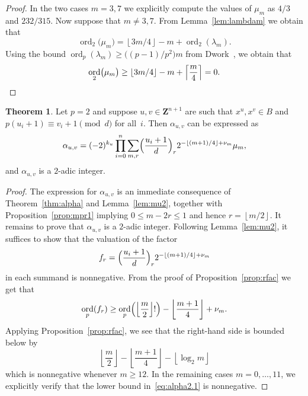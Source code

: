 \documentclass[a4paper,11pt]{article}
\numberwithin{equation}{section}
\providecommand{\floor}[1]{\left\lfloor#1\right\rfloor}   %
\providecommand{\ceil}[1]{\left\lceil#1\right\rceil}   %
\newcommand{\ZZ}{\mathbf{Z}} %
\DeclareMathOperator{\ord}{ord}          %
\theoremstyle{definition}
\newtheorem{thm}{Theorem}[section]
\begin{document}
\begin{proof}
In the two cases $m = 3, 7$ we explicitly compute the values of 
$\mu_m$ as $4/3$ and $232/315$.  Now suppose that $m \neq 3, 7$. 
From Lemma~\ref{lem:lambdam} we obtain that 
\begin{equation*}
\ord_2 \bigl(\mu_m\bigr) 
    = \floor{3m/4} - m + \ord_2(\lambda_m).
\end{equation*}
Using the bound $\ord_p(\lambda_m) \geq \bigl((p-1)/p^2\bigr) m$ from 
Dwork~\citep[pp.~55--57]{Dwork1962}, we obtain that 
\begin{equation*}
\ord_2 \bigl(\mu_m\bigr) 
    \geq \floor{3m/4} - m + \ceil{\frac{m}{4}} = 0. \qedhere
\end{equation*}
\end{proof}

\begin{thm} \label{thm:alpha2}
Let $p = 2$ and suppose $u, v \in \ZZ^{n+1}$ are such that 
$x^u, x^v \in B$ and $p (u_i + 1) \equiv v_i + 1 \pmod{d}$ 
for all~$i$.  Then $\alpha_{u,v}$ can be expressed as 
\begin{equation} \label{eq:alpha2.0}
\alpha_{u,v} = (-2)^{k_u} \prod_{i=0}^n \sum_{m,r} 
    \Bigl(\frac{u_i+1}{d}\Bigr)_r 2^{-\floor{(m+1)/4}+\nu_m} \mu_m, 
\end{equation}
and $\alpha_{u,v}$ is a $2$-adic integer.
\end{thm}

\begin{proof}
The expression for $\alpha_{u,v}$ is an immediate consequence 
of Theorem~\ref{thm:alpha} and Lemma~\ref{lem:mu2}, together with 
Proposition~\ref{prop:mpr1} implying $0 \leq m - 2r \leq 1$ and 
hence $r = \floor{m/2}$.  It remains to prove that 
$\alpha_{u,v}$ is a $2$-adic integer.  Following Lemma~\ref{lem:mu2}, 
it suffices to show that the valuation of the factor 
\begin{equation} \label{eq:fr}
f_r=\Bigl(\frac{u_i+1}{d}\Bigr)_r 2^{- \floor{(m+1)/4} + \nu_m}
\end{equation}
in each summand is nonnegative.  From the proof of 
Proposition~\ref{prop:rfac} we get that 
\begin{equation} \label{eq:alpha2.1}
\ord_p(f_r)
\geq \ord_p\Bigl(\floor{\frac{m}{2}}!\Bigr) - \floor{\frac{m+1}{4}} + \nu_m.
\end{equation}
Applying Proposition~\ref{prop:rfac}, we see that the right-hand side 
is bounded below by 
\begin{equation}
\floor{\frac{m}{2}} - \floor{\frac{m+1}{4}} - \floor{\log_2 m}
\end{equation}
which is nonnegative whenever $m \geq 12$.  In the remaining 
cases $m = 0, \dotsc, 11$, we explicitly verify that the 
lower bound in~\eqref{eq:alpha2.1} is nonnegative.
\end{proof}
\end{document}
